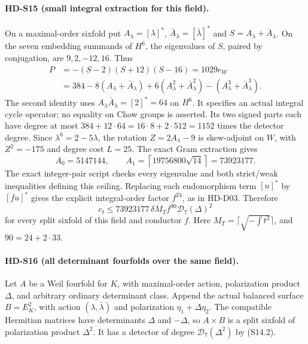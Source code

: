 \paragraph{HD-S15 (small integral extraction for this field).}
On a maximal-order sixfold put \(A_\lambda=[\lambda]^*\),
\(\bar A_\lambda=[\bar\lambda]^*\) and \(S=A_\lambda+\bar A_\lambda\).
On the seven embedding summands of \(H^6\), the eigenvalues of
\(S\), paired by conjugation, are \(9,2,-12,16\).
Thus
\[
 \begin{split}
 P&=-(S-2)(S+12)(S-16)=1029e_W\\
  &=384-8(A_\lambda+\bar A_\lambda)
       +6(A_\lambda^2+\bar A_\lambda^2)
       -(A_\lambda^3+\bar A_\lambda^3).
 \end{split}
\]
The second identity uses
\(A_\lambda\bar A_\lambda=[2]^*=64\) on \(H^6\).
It specifies an actual integral cycle operator; no equality
on Chow groups is asserted. Its two signed parts each have
degree at most
\(384+12\cdot64=16\cdot8+2\cdot512=1152\)
times the detector degree.
Since \(\lambda^6=2-5\lambda\), the rotation
\(Z=2A_\lambda-9\) is skew-adjoint on \(W\), with
\(Z^2=-175\) and degree cost \(L=25\).
The exact Gram extraction gives
\[
 A_0=5147144,\qquad
 A_1=\left\lceil19756800\sqrt{14}\right\rceil=73923177.
\]
The exact integer-pair script checks every eigenvalue and
both strict/weak inequalities defining this ceiling.
Replacing each endomorphism term \([u]^*\) by \([fu]^*\)
gives the explicit integral-order factor \(f^{24}\), as in
HD-D03. Therefore
\[
 \boxed{c_t\le73923177\,\delta M_T f^{90}
                  \mathcal D_7(\Delta)^2}                \tag{S15.1}
\]
for every split sixfold of this field and conductor \(f\).
Here \(M_T=\lceil\sqrt{-\int t^2}\rceil\), and
\(90=24+2\cdot33\).

\paragraph{HD-S16 (all determinant fourfolds over the same field).}
Let \(A\) be a Weil fourfold for \(K\), with maximal-order
action, polarization product \(\Delta\), and arbitrary ordinary
determinant class. Append the actual balanced surface
\(B=E_K^2\), with action \((\lambda,\bar\lambda)\) and
polarization \(\eta_1+\Delta\eta_2\).
The compatible Hermitian matrices have determinants
\(\Delta\) and \(-\Delta\), so \(A\times B\) is a split
sixfold of polarization product \(\Delta^2\).
It has a detector of degree \(\mathcal D_7(\Delta^2)\)
by (S14.2).


